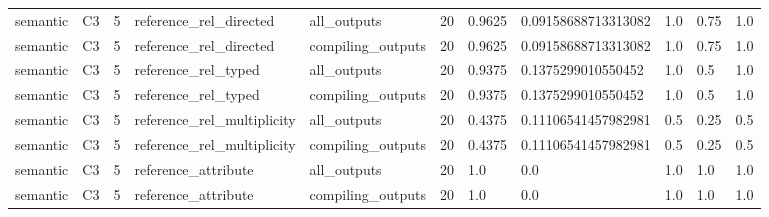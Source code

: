 \begin{tabular}{lllllllllll}
semantic & C3 & 5 & reference\_rel\_directed & all\_outputs & 20 & 0.9625 & 0.09158688713313082 & 1.0 & 0.75 & 1.0 \\
semantic & C3 & 5 & reference\_rel\_directed & compiling\_outputs & 20 & 0.9625 & 0.09158688713313082 & 1.0 & 0.75 & 1.0 \\
semantic & C3 & 5 & reference\_rel\_typed & all\_outputs & 20 & 0.9375 & 0.1375299010550452 & 1.0 & 0.5 & 1.0 \\
semantic & C3 & 5 & reference\_rel\_typed & compiling\_outputs & 20 & 0.9375 & 0.1375299010550452 & 1.0 & 0.5 & 1.0 \\
semantic & C3 & 5 & reference\_rel\_multiplicity & all\_outputs & 20 & 0.4375 & 0.11106541457982981 & 0.5 & 0.25 & 0.5 \\
semantic & C3 & 5 & reference\_rel\_multiplicity & compiling\_outputs & 20 & 0.4375 & 0.11106541457982981 & 0.5 & 0.25 & 0.5 \\
semantic & C3 & 5 & reference\_attribute & all\_outputs & 20 & 1.0 & 0.0 & 1.0 & 1.0 & 1.0 \\
semantic & C3 & 5 & reference\_attribute & compiling\_outputs & 20 & 1.0 & 0.0 & 1.0 & 1.0 & 1.0 \\
\end{tabular}